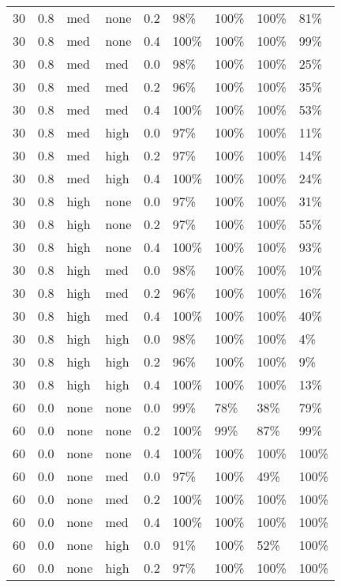 \begin{longtable}{rrllrllll}
  30 & 0.8 & med & none & 0.2 & 98\% & 100\% & 100\% & 81\% \\ 
  30 & 0.8 & med & none & 0.4 & 100\% & 100\% & 100\% & 99\% \\ 
  30 & 0.8 & med & med & 0.0 & 98\% & 100\% & 100\% & 25\% \\ 
  30 & 0.8 & med & med & 0.2 & 96\% & 100\% & 100\% & 35\% \\ 
  30 & 0.8 & med & med & 0.4 & 100\% & 100\% & 100\% & 53\% \\ 
  30 & 0.8 & med & high & 0.0 & 97\% & 100\% & 100\% & 11\% \\ 
  30 & 0.8 & med & high & 0.2 & 97\% & 100\% & 100\% & 14\% \\ 
  30 & 0.8 & med & high & 0.4 & 100\% & 100\% & 100\% & 24\% \\ 
  30 & 0.8 & high & none & 0.0 & 97\% & 100\% & 100\% & 31\% \\ 
  30 & 0.8 & high & none & 0.2 & 97\% & 100\% & 100\% & 55\% \\ 
  30 & 0.8 & high & none & 0.4 & 100\% & 100\% & 100\% & 93\% \\ 
  30 & 0.8 & high & med & 0.0 & 98\% & 100\% & 100\% & 10\% \\ 
  30 & 0.8 & high & med & 0.2 & 96\% & 100\% & 100\% & 16\% \\ 
  30 & 0.8 & high & med & 0.4 & 100\% & 100\% & 100\% & 40\% \\ 
  30 & 0.8 & high & high & 0.0 & 98\% & 100\% & 100\% & 4\% \\ 
  30 & 0.8 & high & high & 0.2 & 96\% & 100\% & 100\% & 9\% \\ 
  30 & 0.8 & high & high & 0.4 & 100\% & 100\% & 100\% & 13\% \\ 
  60 & 0.0 & none & none & 0.0 & 99\% & 78\% & 38\% & 79\% \\ 
  60 & 0.0 & none & none & 0.2 & 100\% & 99\% & 87\% & 99\% \\ 
  60 & 0.0 & none & none & 0.4 & 100\% & 100\% & 100\% & 100\% \\ 
  60 & 0.0 & none & med & 0.0 & 97\% & 100\% & 49\% & 100\% \\ 
  60 & 0.0 & none & med & 0.2 & 100\% & 100\% & 100\% & 100\% \\ 
  60 & 0.0 & none & med & 0.4 & 100\% & 100\% & 100\% & 100\% \\ 
  60 & 0.0 & none & high & 0.0 & 91\% & 100\% & 52\% & 100\% \\ 
  60 & 0.0 & none & high & 0.2 & 97\% & 100\% & 100\% & 100\% \\ 

\end{longtable}
